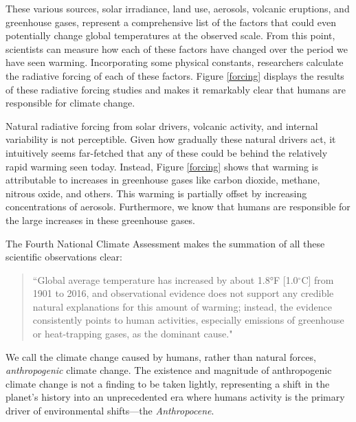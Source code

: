 These various sources, solar irradiance, land use, aerosols, volcanic eruptions, and greenhouse gases, represent a comprehensive list of the factors that could even potentially change global temperatures at the observed scale. From this point, scientists can measure how each of these factors have changed over the period we have seen warming. Incorporating some physical constants, researchers calculate the radiative forcing of each of these factors. Figure \ref{forcing} displays the results of these radiative forcing studies and makes it remarkably clear that humans are responsible for climate change. 

Natural radiative forcing from solar drivers, volcanic activity, and internal variability is not perceptible. Given how gradually these natural drivers act, it intuitively seems far-fetched that any of these could be behind the relatively rapid warming seen today. Instead, Figure \ref{forcing} shows that warming is attributable to increases in greenhouse gases like carbon dioxide, methane, nitrous oxide, and others. This warming is partially offset by increasing concentrations of aerosols. Furthermore, we know that humans are responsible for the large increases in these greenhouse gases. 

The Fourth National Climate Assessment makes the summation of all these scientific observations clear:
\begin{quote}
\singlespacing ``Global average temperature has increased by about 1.8°F [1.0$^\circ$C] from 1901 to 2016, and observational evidence does not support any credible natural explanations for this amount of warming; instead, the evidence consistently points to human activities, especially emissions of greenhouse or heat-trapping gases, as the dominant cause." \citep{nationalar4}
\end{quote}
We call the climate change caused by humans, rather than natural forces, \emph{anthropogenic} climate change. The existence and magnitude of anthropogenic climate change is not a finding to be taken lightly, representing a shift in the planet's history into an unprecedented era where humans activity is the primary driver of environmental shifts---the \emph{Anthropocene}.



